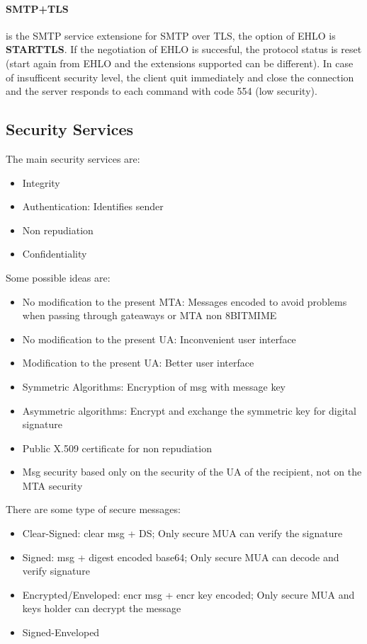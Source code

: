\documentclass[12pt]{article}
\begin{document}
\paragraph{SMTP+TLS} is the SMTP service extensione for SMTP over TLS, the option of EHLO is \textbf{STARTTLS}. If the negotiation of EHLO is succesful, the protocol status is reset (start again from EHLO and the extensions supported can be different). In case of insufficent security level, the client quit immediately and close the connection and the server responds to each command with code 554 (low security).

\subsection{Security Services}
The main security services are:
\begin{itemize}
  \item Integrity
  \item Authentication: Identifies sender
  \item Non repudiation
  \item Confidentiality
\end{itemize}
Some possible ideas are:
\begin{itemize}
  \item No modification to the present MTA: Messages encoded to avoid problems when passing through gateaways or MTA non 8BITMIME
  \item No modification to the present UA: Inconvenient user interface
  \item Modification to the present UA: Better user interface
  \item Symmetric Algorithms: Encryption of msg with message key
  \item Asymmetric algorithms: Encrypt and exchange the symmetric key for digital signature
  \item Public X.509 certificate for non repudiation
  \item Msg security based only on the security of the UA of the recipient, not on the MTA security
\end{itemize}
There are some type of secure messages:
\begin{itemize}
  \item Clear-Signed: clear msg + DS; Only secure MUA can verify the signature
  \item Signed: msg + digest encoded base64; Only secure MUA can decode and verify signature
  \item Encrypted/Enveloped: encr msg + encr key encoded; Only secure MUA and keys holder can decrypt the message
  \item Signed-Enveloped
\end{itemize}
\end{document}
